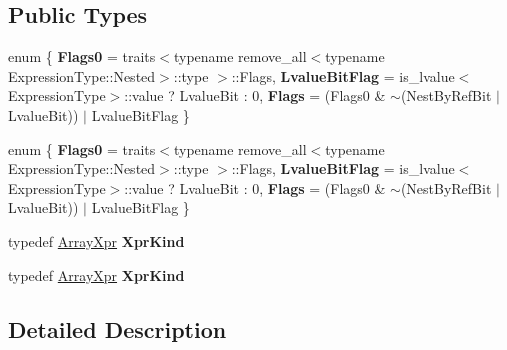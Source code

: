 \subsection*{Public Types}
\begin{DoxyCompactItemize}
\item 
\mbox{\label{struct_eigen_1_1internal_1_1traits_3_01_array_wrapper_3_01_expression_type_01_4_01_4_a85560acbfcc58b3851dbaff7710a3b0d}} 
enum \{ {\bfseries Flags0} = traits$<$typename remove\+\_\+all$<$typename Expression\+Type\+:\+:Nested$>$\+:\+:type $>$\+:\+:Flags, 
{\bfseries Lvalue\+Bit\+Flag} = is\+\_\+lvalue$<$Expression\+Type$>$\+:\+:value ? Lvalue\+Bit \+: 0, 
{\bfseries Flags} = (Flags0 \& $\sim$(Nest\+By\+Ref\+Bit $\vert$ Lvalue\+Bit)) $\vert$ Lvalue\+Bit\+Flag
 \}
\item 
\mbox{\label{struct_eigen_1_1internal_1_1traits_3_01_array_wrapper_3_01_expression_type_01_4_01_4_a5b38f7373ed967fa65982efd569269a0}} 
enum \{ {\bfseries Flags0} = traits$<$typename remove\+\_\+all$<$typename Expression\+Type\+:\+:Nested$>$\+:\+:type $>$\+:\+:Flags, 
{\bfseries Lvalue\+Bit\+Flag} = is\+\_\+lvalue$<$Expression\+Type$>$\+:\+:value ? Lvalue\+Bit \+: 0, 
{\bfseries Flags} = (Flags0 \& $\sim$(Nest\+By\+Ref\+Bit $\vert$ Lvalue\+Bit)) $\vert$ Lvalue\+Bit\+Flag
 \}
\item 
\mbox{\label{struct_eigen_1_1internal_1_1traits_3_01_array_wrapper_3_01_expression_type_01_4_01_4_ac2e2f91554c6a8582dc117f67212a036}} 
typedef \hyperlink{struct_eigen_1_1_array_xpr}{Array\+Xpr} {\bfseries Xpr\+Kind}
\item 
\mbox{\label{struct_eigen_1_1internal_1_1traits_3_01_array_wrapper_3_01_expression_type_01_4_01_4_ac2e2f91554c6a8582dc117f67212a036}} 
typedef \hyperlink{struct_eigen_1_1_array_xpr}{Array\+Xpr} {\bfseries Xpr\+Kind}
\end{DoxyCompactItemize}


\subsection{Detailed Description}
